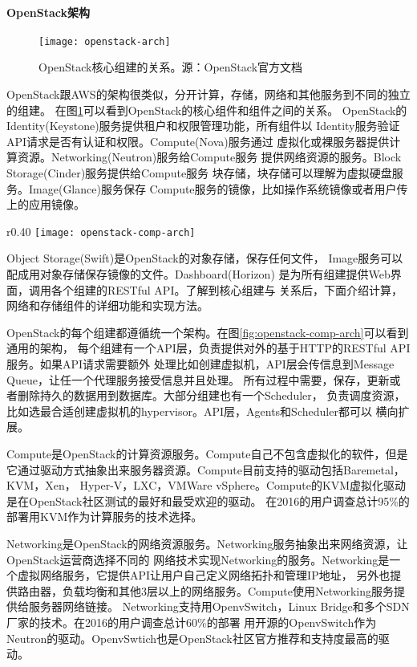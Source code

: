 \paragraph{OpenStack架构}
\begin{figure}
  \centering
    \texttt{[image: openstack-arch]}
    \caption{OpenStack核心组建的关系。源：OpenStack官方文档}
  \label{fig:openstack-arch}
\end{figure}
OpenStack跟AWS的架构很类似，分开计算，存储，网络和其他服务到不同的独立的组建。
在图\ref{fig:openstack-arch}可以看到OpenStack的核心组件和组件之间的关系。
OpenStack的Identity(Keystone)服务提供租户和权限管理功能，所有组件以
Identity服务验证API请求是否有认证和权限。Compute(Nova)服务通过
虚拟化或裸服务器提供计算资源。Networking(Neutron)服务给Compute服务
提供网络资源的服务。Block Storage(Cinder)服务提供给Compute服务
块存储，块存储可以理解为虚拟硬盘服务。Image(Glance)服务保存
Compute服务的镜像，比如操作系统镜像或者用户传上的应用镜像。
\begin{wrapfigure}{r}{0.40\textwidth}
  \centering
    \texttt{[image: openstack-comp-arch]}
    \caption{OpenStack组建通用架构}
  \label{fig:openstack-comp-arch}
\end{wrapfigure}
Object Storage(Swift)是OpenStack的对象存储，保存任何文件，
Image服务可以配成用对象存储保存镜像的文件。Dashboard(Horizon)
是为所有组建提供Web界面，调用各个组建的RESTful API。了解到核心组建与
关系后，下面介绍计算，网络和存储组件的详细功能和实现方法。

OpenStack的每个组建都遵循统一个架构。在图\ref{fig:openstack-comp-arch}可以看到通用的架构，
每个组建有一个API层，负责提供对外的基于HTTP的RESTful API服务。如果API请求需要额外
处理比如创建虚拟机，API层会传信息到Message Queue，让任一个代理服务接受信息并且处理。
所有过程中需要，保存，更新或者删除持久的数据用到数据库。大部分组建也有一个Scheduler，
负责调度资源，比如选最合适创建虚拟机的hypervisor。API层，Agents和Scheduler都可以
横向扩展。

Compute是OpenStack的计算资源服务。Compute自己不包含虚拟化的软件，但是
它通过驱动方式抽象出来服务器资源。Compute目前支持的驱动包括Baremetal，KVM，Xen，
Hyper-V，LXC，VMWare vSphere。Compute的KVM虚拟化驱动是在OpenStack社区测试的最好和最受欢迎的驱动。
在2016的用户调查总计95\%的部署用KVM作为计算服务的技术选择。

Networking是OpenStack的网络资源服务。Networking服务抽象出来网络资源，让OpenStack运营商选择不同的
网络技术实现Networking的服务。Networking是一个虚拟网络服务，它提供API让用户自己定义网络拓扑和管理IP地址，
另外也提供路由器，负载均衡和其他3层以上的网络服务。Compute使用Networking服务提供给服务器网络链接。
Networking支持用OpenvSwitch，Linux Bridge和多个SDN厂家的技术。在2016的用户调查总计60\%的部署
用开源的OpenvSwitch作为Neutron的驱动。OpenvSwtich也是OpenStack社区官方推荐和支持度最高的驱动。


